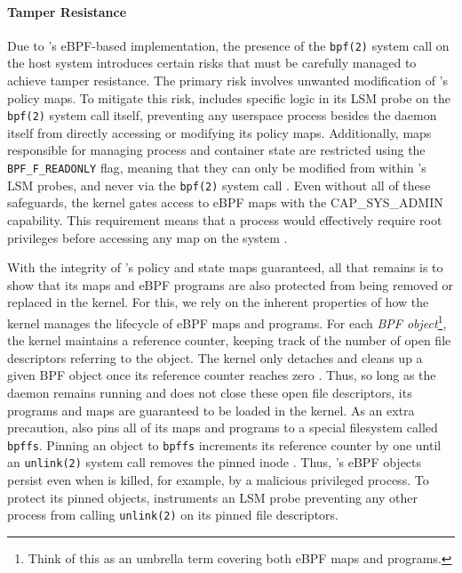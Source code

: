 \paragraph*{Tamper Resistance}

Due to \bpfcontain{}'s eBPF-based implementation, the presence of the \texttt{bpf(2)} system call on the host system introduces certain risks that must be carefully managed to achieve tamper resistance. The primary risk involves unwanted modification of \bpfcontain{}'s policy maps. To mitigate this risk, \bpfcontain{} includes specific logic in its LSM probe on the \texttt{bpf(2)} system call itself, preventing any userspace process besides the \bpfcontain{} daemon itself from directly accessing or modifying its policy maps. Additionally, maps responsible for managing process and container state are restricted using the \texttt{BPF\_F\_READONLY} flag, meaning that they can only be modified from within \bpfcontain{}'s LSM probes, and never via the \texttt{bpf(2)} system call \cite{linux_bpf}. Even without all of these safeguards, the kernel gates access to eBPF maps with the CAP\_SYS\_ADMIN capability. This requirement means that a process would effectively require root privileges before accessing any map on the system \cite{linux_bpf}.

With the integrity of \bpfcontain{}'s policy and state maps guaranteed, all that remains is to show that its maps and eBPF programs are also protected from being removed or replaced in the kernel. For this, we rely on the inherent properties of how the kernel manages the lifecycle of eBPF maps and programs. For each \textit{BPF object}\footnote{Think of this as an umbrella term covering both eBPF maps and programs.}, the kernel maintains a reference counter, keeping track of the number of open file descriptors referring to the object. The kernel only detaches and cleans up a given BPF object once its reference counter reaches zero \cite{starovoitov2018_lifetime}. Thus, so long as the \bpfcontain{} daemon remains running and does not close these open file descriptors, its programs and maps are guaranteed to be loaded in the kernel. As an extra precaution, \bpfcontain{} also pins all of its maps and programs to a special filesystem called \texttt{bpffs}. Pinning an object to \texttt{bpffs} increments its reference counter by one until an \texttt{unlink(2)} system call removes the pinned inode \cite{starovoitov2018_lifetime}. Thus, \bpfcontain{}'s eBPF objects persist even when \bpfcontain{} is killed, for example, by a malicious privileged process. To protect its pinned objects, \bpfcontain{} instruments an LSM probe preventing any other process from calling \texttt{unlink(2)} on its pinned file descriptors.


